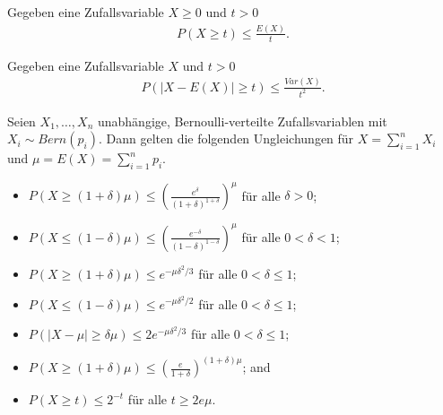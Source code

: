 \documentclass{beamer}
\begin{document}
\begin{frame}
    \begin{definition}[Markov]
        Gegeben eine Zufallsvariable $X \geq 0$ und $t > 0$
        \begin{align*}
            P(X \geq t) \leq \frac{E(X)}{t}.
        \end{align*}
    \end{definition}\pause
    \begin{definition}[Chebyshev]
        Gegeben eine Zufallsvariable $X$ und $t > 0$
        \begin{align*}
            P(|X - E(X)| \geq t) \leq \frac{Var(X)}{t^2}.
        \end{align*}
    \end{definition}
\end{frame}

\begin{frame}
    \begin{definition}[Chernoff]
        Seien $X_1, \dots, X_n$ unabhängige, Bernoulli-verteilte Zufallsvariablen mit $X_i \sim Bern(p_i)$. Dann gelten die folgenden Ungleichungen für $X = \sum_{i=1}^n X_i$ und $\mu = E(X) = \sum_{i=1}^n p_i$.\pause
        \begin{itemize}
            \item $P(X \geq (1 + \delta) \mu) \leq \left(\frac{e^{\delta}}{(1 + \delta)^{1 + \delta}}\right)^{\mu}$ für alle $\delta > 0$;
            \item $P(X \leq (1 - \delta) \mu) \leq \left(\frac{e^{- \delta}}{(1 - \delta)^{1 - \delta}}\right)^{\mu}$ für alle $0 < \delta < 1$\pause;
            \item $P(X \geq (1 + \delta) \mu) \leq e^{- \mu \delta^2 / 3}$ für alle $0 < \delta \leq 1$;
            \item $P(X \leq (1 - \delta) \mu) \leq e^{- \mu \delta^2 / 2}$ für alle $0 < \delta \leq 1$;
            \item $P(|X - \mu| \geq \delta \mu) \leq 2 e^{- \mu \delta^2 / 3}$ für alle $0 < \delta \leq 1$;
            \item $P(X \geq (1 + \delta) \mu) \leq \left(\frac{e}{1 + \delta}\right)^{(1 + \delta) \mu}$; and
            \item $P(X \geq t) \leq 2^{-t}$ für alle $t \geq 2 e \mu$.
        \end{itemize}
    \end{definition}
\end{frame}
\end{document}
